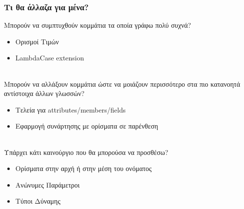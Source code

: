 \documentclass{beamer}
\def\e{\foreignlanguage{english}}
\begin{document}
\begin{frame}

\frametitle{Τι θα άλλαζα για μένα?}

Μπορούν να συμπτυχθούν κομμάτια τα οποία γράφω πολύ συχνά?
\begin{itemize}

\item Ορισμοί Τιμών

\item \e{LambdaCase extension}
\\~\

\end{itemize}

\pause
Μπορούν να αλλάξουν κομμάτια ώστε να μοιάζουν περισσότερο στα πιο κατανοητά
αντίστοιχα άλλων γλωσσών?
\begin{itemize}

\item Τελεία για \e{attributes/members/fields}

\item Εφαρμογή συνάρτησης με ορίσματα σε παρένθεση
\\~\

\end{itemize}

\pause
Υπάρχει κάτι καινούργιο που θα μπορούσα να προσθέσω?
\begin{itemize}

\item Ορίσματα στην αρχή ή στην μέση του ονόματος

\item Ανώνυμες Παράμετροι

\item Τύποι Δύναμης

\end{itemize}

\end{frame}
\end{document}

